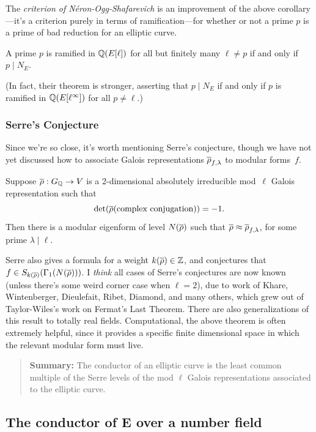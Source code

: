 \documentclass{book}
\begin{document}
The {\em criterion of N\'eron-Ogg-Shafarevich} is an improvement
of the above corollary---it's a criterion purely
in terms of ramification---for whether or not a prime
$p$ is a prime of bad reduction for an elliptic curve.
\begin{theorem}
A prime $p$ is ramified in $\mathbb{Q}(E[\ell])$ for all but
finitely many $\ell\neq p$ if and only if $p\mid N_E$.
\end{theorem}
(In fact, their theorem is stronger, asserting that $p\mid N_E$
if and only if $p$ is ramified in $\mathbb{Q}(E[\ell^\infty])$ for
all $p\neq \ell$.)


\subsubsection{Serre's Conjecture}
Since we're so close, it's worth mentioning Serre's conjecture,
though we have not yet discussed how to
associate Galois representations $\overline{\rho}_{f,\lambda}$
to modular forms~$f$.
\begin{theorem}
Suppose $\overline{\rho}:G_{\mathbb{Q}}\to V$
is a 2-dimensional absolutely irreducible
mod~$\ell$ Galois representation such that
$$\det(\overline{\rho}(\text{\rm complex conjugation})) =-1.$$
Then there is a modular eigenform of level
$N(\overline{\rho})$ such that $\overline{\rho} \approx \overline{\rho}_{f,\lambda}$,
for some prime $\lambda\mid \ell$.
\end{theorem}
Serre also gives a formula for a weight $k(\overline{\rho})\in\mathbb{Z}$, and
conjectures that $f\in S_{k(\overline{\rho})}(\Gamma_1(N(\overline{\rho})))$.
I {\em think} all cases of Serre's conjectures are now known
(unless there's some weird corner case when $\ell=2$), due to
work of Khare, Wintenberger, Dieulefait, Ribet, Diamond, and many
others, which grew out of Taylor-Wiles's work on Fermat's Last Theorem.
There are also generalizations of this result to totally real
fields.  Computational, the above theorem is often extremely
helpful, since it provides a specific finite dimensional space
in which the relevant modular form must live.


\begin{quote}
{\bf Summary:} The conductor of an elliptic curve is the least common multiple
of the Serre levels of the mod $\ell$ Galois representations associated to the
elliptic curve.
\end{quote}

\subsection{The conductor of E over a number field}\label{sec:condnf}
\end{document}

